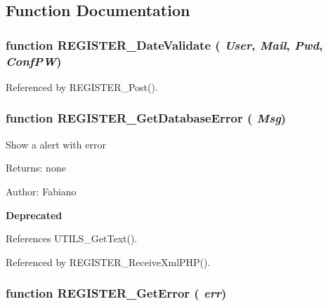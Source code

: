 \subsection{Function Documentation}
\subsubsection{\setlength{\rightskip}{0pt plus 5cm}function REGISTER\_\-DateValidate ( {\em User}, \/   {\em Mail}, \/   {\em Pwd}, \/   {\em ConfPW})}\label{register_8js_d13d62f6d4bc07251fde3160659eea8f}




Referenced by REGISTER\_\-Post().
\subsubsection{\setlength{\rightskip}{0pt plus 5cm}function REGISTER\_\-GetDatabaseError ( {\em Msg})}\label{register_8js_6f672d4c31ec61239d0c447e2d909d45}


Show a alert with error \begin{Desc}
\item[Returns:]none\end{Desc}
\begin{Desc}
\item[Author:]Fabiano \end{Desc}
\begin{Desc}
\item[{\bf Deprecated}]\end{Desc}


References UTILS\_\-GetText().

Referenced by REGISTER\_\-ReceiveXmlPHP().
\subsubsection{\setlength{\rightskip}{0pt plus 5cm}function REGISTER\_\-GetError ( {\em err})}\label{register_8js_0f784aa2bb5cd6b876e736d01611a1fe}





